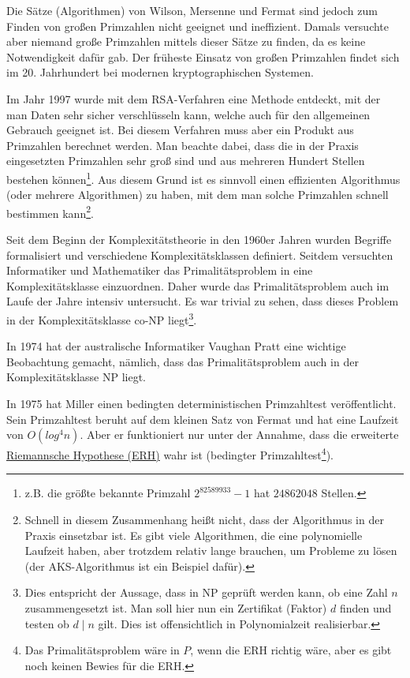 \documentclass[12pt,oneside]{article}
\theoremstyle{remark}
\theoremstyle{definition}
\begin{document}
Die Sätze (Algorithmen) von Wilson, Mersenne und Fermat sind jedoch zum Finden von großen Primzahlen nicht geeignet und ineffizient. Damals versuchte aber niemand große Primzahlen mittels dieser Sätze zu finden, da es keine Notwendigkeit dafür gab. Der früheste Einsatz von großen Primzahlen findet sich im 20. Jahrhundert bei modernen kryptographischen Systemen\cite{krypWiki}.

Im Jahr 1997 wurde mit dem RSA-Verfahren eine Methode entdeckt, mit der man Daten sehr sicher verschlüsseln kann, welche auch für den allgemeinen Gebrauch geeignet ist. Bei diesem Verfahren muss aber ein Produkt aus Primzahlen berechnet werden\cite{rsa}. Man beachte dabei, dass die in der Praxis eingesetzten Primzahlen sehr groß sind und aus mehreren Hundert Stellen bestehen können\footnote{z.B. die größte bekannte Primzahl $2^{82589933} - 1$ hat $24862048$ Stellen\cite{largePrimes}.}. Aus diesem Grund ist es sinnvoll einen effizienten Algorithmus (oder mehrere Algorithmen) zu haben, mit dem man solche Primzahlen \textquotedbl schnell\textquotedbl   $\;$ bestimmen kann\footnote{Schnell in diesem Zusammenhang heißt nicht, dass der Algorithmus in der Praxis einsetzbar ist. Es gibt viele Algorithmen, die eine polynomielle Laufzeit haben, aber trotzdem relativ lange brauchen, um Probleme zu lösen (der AKS-Algorithmus ist ein Beispiel dafür).}.

Seit dem Beginn der Komplexitätstheorie in den 1960er Jahren wurden Begriffe formalisiert und verschiedene Komplexitätsklassen definiert\cite{com-theory}. Seitdem versuchten Informatiker und Mathematiker das Primalitätsproblem in eine Komplexitätsklasse einzuordnen. Daher wurde das Primalitätsproblem auch im Laufe der Jahre intensiv untersucht. Es war trivial zu sehen, dass dieses Problem in der Komplexitätsklasse co-NP liegt\footnote{Dies entspricht der Aussage, dass in NP geprüft werden kann, ob eine Zahl $n$ zusammengesetzt ist. Man soll hier nun ein Zertifikat (Faktor) $d$ finden und testen ob $d \mid n$ gilt. Dies ist offensichtlich in Polynomialzeit realisierbar.}.

In 1974 hat der australische Informatiker Vaughan Pratt eine wichtige Beobachtung gemacht, nämlich, dass das Primalitätsproblem auch in der Komplexitätsklasse NP liegt\cite{pratt}.\newline

In 1975 hat Miller einen bedingten deterministischen Primzahltest veröffentlicht\cite{miller}. Sein Primzahltest beruht auf dem kleinen Satz von Fermat und hat eine Laufzeit von $O(log^4 n)$. Aber er funktioniert nur unter der Annahme, dass die erweiterte \href{https://en.wikipedia.org/wiki/Riemann_hypothesis}{Riemannsche Hypothese (ERH)} wahr ist (bedingter Primzahltest\footnote{Das Primalitätsproblem wäre in $P$, wenn die ERH richtig wäre, aber es gibt noch keinen Bewies für die ERH.}).
\end{document}
